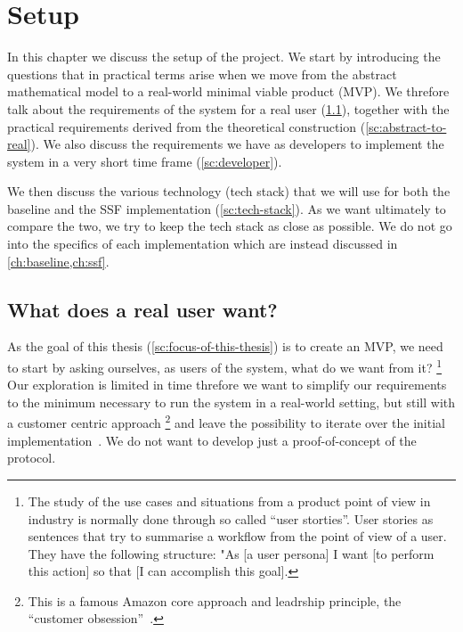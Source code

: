 \chapter{Setup}\label{ch:setup}

In this chapter we discuss the setup of the project.
We start by introducing the questions that in practical
terms arise when we move from the abstract mathematical
model to a real-world minimal viable product (MVP).
We threfore talk about the requirements of the system
for a real user (\cref{sc:real-user}), together with the 
practical requirements
derived from the theoretical construction (\cref{sc:abstract-to-real}).
We also discuss the requirements we have as developers
to implement the system in a very short time frame
(\cref{sc:developer}).

We then discuss the various technology (tech stack) 
that we will use for both the baseline and the SSF 
implementation (\cref{sc:tech-stack}).
As we want ultimately to compare the two, we
try to keep the tech stack as close as possible.
We do not go into the specifics of each implementation
which are instead discussed in \cref{ch:baseline,ch:ssf}.

\section{What does a real user want?}\label{sc:real-user}

As the goal of this thesis (\cref{sc:focus-of-this-thesis})
is to create an MVP, we need to start by asking ourselves,
as users of the system, what do we want from it?
\footnote{The study of the use cases and situations from a product 
point of view in industry is normally done through so called ``user storties''.
User stories as sentences that try to summarise a workflow from the
point of view of a user. They have the following structure:
"As [a user persona] I want [to perform this action] so that [I can accomplish this goal].}
Our exploration is limited in time threfore we want to simplify
our requirements to the minimum necessary to run the system
in a real-world setting, 
but still with a customer centric approach
\footnote{This is a famous Amazon core approach and leadrship principle, the ``customer obsession''~\cite{AmazonLeadershipPrinciples}.}
and leave the possibility to iterate over the initial implementation~\cite{ries2011startup}.
We do not want to develop just a proof-of-concept of the protocol.

